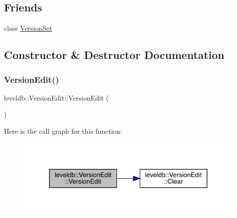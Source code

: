 \subsection*{Friends}
\begin{DoxyCompactItemize}
\item 
class \mbox{\hyperlink{classleveldb_1_1_version_edit_a1827cd1b4d6e9e3c378ce37ca3cce635}{Version\+Set}}
\end{DoxyCompactItemize}


\subsection{Constructor \& Destructor Documentation}
\mbox{\label{classleveldb_1_1_version_edit_a60dd9c72d256ed1bda68597a9263333e}} 
\subsubsection{\texorpdfstring{VersionEdit()}{VersionEdit()}}
{\footnotesize\ttfamily leveldb\+::\+Version\+Edit\+::\+Version\+Edit (\begin{DoxyParamCaption}{ }\end{DoxyParamCaption})\hspace{0.3cm}{\ttfamily [inline]}}

Here is the call graph for this function\+:
\nopagebreak
\begin{figure}[H]
\begin{center}
\leavevmode
\includegraphics[width=324pt]{classleveldb_1_1_version_edit_a60dd9c72d256ed1bda68597a9263333e_cgraph}
\end{center}
\end{figure}
\mbox{\label{classleveldb_1_1_version_edit_a8863bc7fa645c4bc2518910429447fbe}} 
